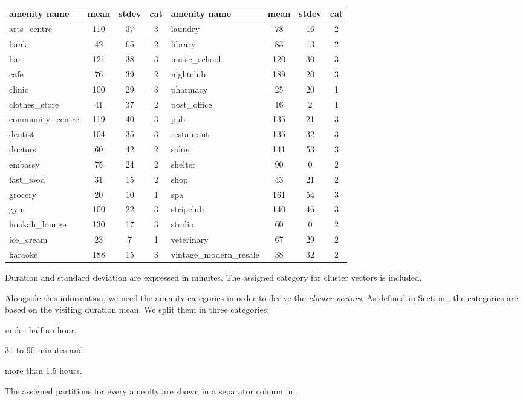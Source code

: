 \begin{table}[!ht]
	{\begin{tabular}{ | l | c | c | c || l | c | c | c |}
		\hline		
		\textbf{amenity name} & \textbf{mean} & \textbf{stdev} & \textbf{cat} & \textbf{amenity name} & \textbf{mean} & \textbf{stdev} & \textbf{cat} \\ \hline
		arts\_centre  & 110 & 37 & 3 & laundry  & 78 & 16 & 2 \\ \hline
		bank  & 42 & 65 & 2 &  library  & 83 & 13 & 2 \\ \hline
		bar  & 121 & 38 & 3 &  music\_school  & 120 & 30 & 3 \\ \hline
		cafe  & 76 & 39 & 2 &  nightclub  & 189 & 20 & 3 \\ \hline
		clinic  & 100 & 29 & 3 &  pharmacy  & 25 & 20 & 1 \\ \hline
		clothes\_store  & 41 & 37 & 2 &  post\_office  & 16 & 2 & 1 \\ \hline
		community\_centre  & 119 & 40 & 3 &  pub  & 135 & 21 & 3 \\ \hline
		dentist  & 104 & 35 & 3 &  restaurant  & 135 & 32 & 3 \\ \hline
		doctors  & 60 & 42 & 2 &  salon  & 141 & 53 & 3 \\ \hline
		embassy  & 75 & 24 & 2 &  shelter  & 90 & 0 & 2 \\ \hline
		fast\_food  & 31 & 15 & 2 &  shop  & 43 & 21 & 2 \\ \hline
		grocery  & 20 & 10 & 1 &  spa  & 161 & 54 & 3 \\ \hline
		gym  & 100 & 22 & 3 &  stripclub  & 140 & 46 & 3 \\ \hline
		hookah\_lounge  & 130 & 17 & 3 &  studio  & 60 & 0 & 2 \\ \hline
		ice\_cream  & 23 & 7 & 1 &  veterinary  & 67 & 29 & 2 \\ \hline
		karaoke  & 188 & 15 & 3 & {\scriptsize vintage\_modern\_resale}  & 38 & 32 & 2 \\ \hline
	\end{tabular}}
	\label{tab:amenities_google_places}
	\begin{tabnote}
		Duration and standard deviation are expressed in minutes. The assigned category for cluster vectors is included.
	\end{tabnote}
\end{table}

Alongside this information, we need the amenity categories in order to derive the \textit{cluster vectors}.
As defined in Section , the categories are based on the visiting duration mean.
We split them in three categories: 
\begin{romanlist}
	\item 	under half an hour,
	\item	31 to 90 minutes and
	\item 	more than 1.5 hours. 
\end{romanlist}
The assigned partitions for every amenity are shown in a separator column in . 

